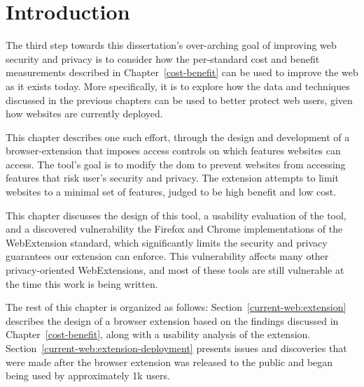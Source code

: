 \section{Introduction}
\label{current-web:current-web}

The third step towards this dissertation's over-arching goal of improving web
security and privacy is to consider how the per-standard cost and benefit
measurements described in Chapter~\ref{cost-benefit} can be used to improve the
web as it exists today.  More specifically, it is to explore how the data and
techniques discussed in the previous chapters can be used to better protect web
users, given how websites are currently deployed.

This chapter describes one such effort, through the design and development
of a browser-extension that imposes access controls on which \WAPI features
websites can access.  The tool's goal is to modify the \gls{dom} to prevent
websites from accessing features that risk user's security and privacy. The
extension attempts to limit websites to a minimal set of features, judged to
be high benefit and low cost.

This chapter discusses the design of this tool, a usability evaluation
of the tool, and a discovered vulnerability the Firefox and Chrome
implementations of the WebExtension standard, which significantly limits the
security and privacy guarantees our extension can enforce.  This
vulnerability affects many other privacy-oriented WebExtensions, and most
of these tools are still vulnerable at the time this work is being written.

The rest of this chapter is organized as follows:
Section~\ref{current-web:extension} describes the design of a browser extension
based on the findings discussed in Chapter~\ref{cost-benefit},
along with a usability analysis of the extension.
Section~\ref{current-web:extension-deployment} presents issues and discoveries
that were made after the browser extension was released to the public and
began being used by approximately 1k users.
